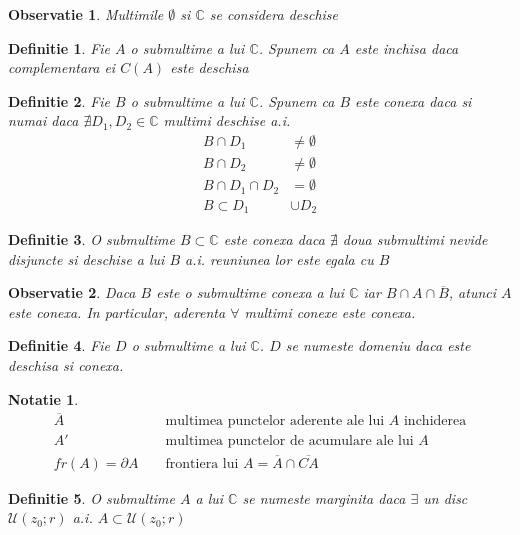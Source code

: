 \documentclass[12pt,a4paper]{article}
\newtheorem{definition}{Definitie}
\newtheorem{notation}{Notatie}
\newtheorem{observation}{Observatie}
\newcommand{\C}{\ensuremath{\mathbb{C}}}
\begin{document}
\begin{observation}
	Multimile $\emptyset$ si $\C$ se considera deschise
\end{observation}

\begin{definition}
	Fie $A$ o submultime a lui $\C$. Spunem ca $A$ este inchisa daca complementara ei $C(A)$ este deschisa
\end{definition}

\begin{definition}
	Fie $B$ o submultime a lui $\C$. Spunem ca $B$ este conexa daca si numai daca $\nexists D_1, D_2 \in \C$ multimi deschise a.i.
	\begin{align*}
		B \cap D_1 &\neq \emptyset \\
		B \cap D_2 &\neq \emptyset \\
		B \cap D_1 \cap D_2 &= \emptyset \\
		B \subset D_1 &\cup D_2
	\end{align*}
\end{definition}

\begin{definition}
	O submultime $B \subset \C$ este conexa daca $\nexists$ doua submultimi nevide disjuncte si deschise a lui $B$ a.i. reuniunea lor este egala cu $B$
\end{definition}

\begin{observation}
	Daca $B$ este o submultime conexa a lui $\C$ iar $B \cap A \cap	\overline{B}$, atunci $A$ este conexa. In particular, aderenta $\forall$ multimi conexe este conexa.
\end{observation}

\begin{definition}
	Fie $D$ o submultime a lui $\C$. $D$ se numeste domeniu daca este deschisa si conexa.
\end{definition}

\begin{notation}
	\begin{align*}
		\overline{A} && \text{ multimea punctelor aderente ale lui } A \text{ inchiderea} \\
		A' && \text { multimea punctelor de acumulare ale lui } A \\
		fr(A) = \partial A && \text { frontiera lui } A = \overline{A} \cap \overline{CA}
	\end{align*}
\end{notation}

\begin{definition}
 	O  submultime $A$ a lui $\C$ se numeste marginita daca $\exists$ un disc $\mathcal{U}(z_0;r)$ a.i. $A \subset \mathcal{U}(z_0;r)$
\end{definition}
\end{document}
